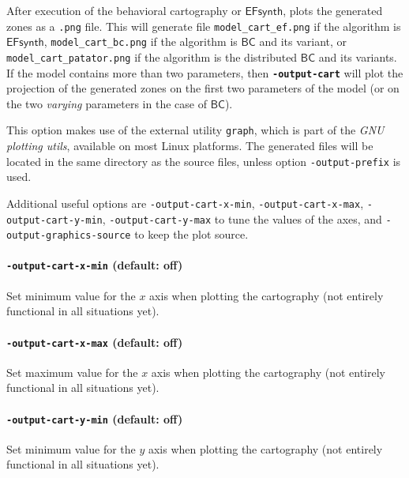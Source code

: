 \documentclass[a4paper,11pt]{report}
\newcommand{\BC}{\ensuremath{\mathsf{BC}}}
\newcommand{\EFsynth}{\ensuremath{\mathsf{EFsynth}}}
\newcommand{\code}[1]{\textbf{\texttt{#1}}}
\newcommand{\styleOption}[1]{\textcolor{optioncolor}{\texttt{#1}}}
\newcommand{\stylePath}[1]{\textcolor{pathcolor}{\texttt{#1}}}
\begin{document}
After execution of the behavioral cartography or \EFsynth{}, plots the generated zones as a \texttt{.png} file.
This will generate file \stylePath{model\_cart\_ef.png} if the algorithm is \EFsynth{},
\stylePath{model\_cart\_bc.png} if the algorithm is \BC{} and its variant,
or \stylePath{model\_cart\_patator.png} if the algorithm is the distributed \BC{} and its variants.
If the model contains more than two parameters, then \code{-output-cart} will plot the projection of the generated zones on the first two parameters of the model (or on the two \emph{varying} parameters in the case of \BC{}).

This option makes use of the external utility \texttt{graph}, which is
part of the \emph{GNU plotting utils}, available on most Linux
platforms.
The generated files will be located in the same directory as the source files, unless option \styleOption{-output-prefix} is used.

Additional useful options are
\styleOption{-output-cart-x-min},
\styleOption{-output-cart-x-max},
\styleOption{-output-cart-y-min},
\styleOption{-output-cart-y-max}
to tune the values of the axes,
and \styleOption{-output-graphics-source} to keep the plot source.


\paragraph{\styleOption{-output-cart-x-min} (default: off)}
Set minimum value for the $x$ axis when plotting the cartography (not entirely functional in all situations yet).

\paragraph{\styleOption{-output-cart-x-max} (default: off)}
Set maximum value for the $x$ axis when plotting the cartography (not entirely functional in all situations yet).

\paragraph{\styleOption{-output-cart-y-min} (default: off)}
Set minimum value for the $y$ axis when plotting the cartography (not entirely functional in all situations yet).
\end{document}
